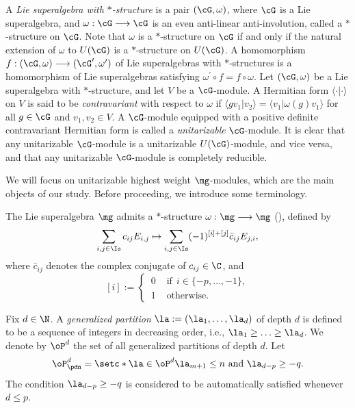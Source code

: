 \documentclass[11pt, reqno]{amsart}
\theoremstyle{definition}
\theoremstyle{remark}
\numberwithin{equation}{section}
\begin{document}
A \emph{Lie superalgebra with $*$-structure} is a pair $(\cG, \omega)$, where $\cG$ is a Lie superalgebra, and $\omega: \cG \longrightarrow \cG$ is an even anti-linear anti-involution, called a $*$-structure on $\cG$.
Note that $\omega$ is a $*$-structure on $\cG$ if and only if the natural extension of $\omega$ to $U(\cG)$ is a $*$-structure on $U(\cG)$.
A homomorphism $f: (\cG, \omega) \longrightarrow (\cG^\prime, \omega^\prime)$ of Lie superalgebras with $*$-structures is a homomorphism of Lie superalgebras satisfying $\omega^\prime \circ f = f \circ \omega$.
%
Let $(\cG, \omega)$ be a Lie superalgebra with $*$-structure, and let $V$ be a $\cG$-module. A Hermitian form $\langle\cdot|\cdot\rangle$ on $V$ is said to be \emph{contravariant} with respect to $\omega$ if
$\langle g v_1 |v_2 \rangle=\langle v_1 |\omega(g)v_1 \rangle$ for all $g \in \cG$ and $v_1, v_2 \in V$.
A $\cG$-module equipped with a positive definite contravariant Hermitian form is called a \emph{unitarizable} $\cG$-module.
It is clear that any unitarizable $\cG$-module is a unitarizable $U(\cG)$-module, and vice versa, and that any unitarizable $\cG$-module is completely reducible.

We will focus on unitarizable highest weight $\mg$-modules, which are the main objects of our study.
Before proceeding, we introduce some terminology.

The Lie superalgebra $\mg$ admits a $*$-structure $\omega: \mg \longrightarrow \mg$ (\cite[Section 3.2]{CLZ}), defined by
\begin{equation} \label{star}
 \sum_{i, j \in \Is} c_{ij} E_{i,j} \mapsto  \sum_{i, j \in \Is} (-1)^{[i]+[j]} \bar{c}_{ij} E_{j,i},
\end{equation}
where $\bar{c}_{ij}$ denotes the complex conjugate of $c_{ij} \in \C$, and
$$
[i]:=  \begin{cases}
      \, 0  & \,\,\mbox{if}  \ \  i \in \{ -p, \ldots, -1\},\\
      \, 1  & \,\, \mbox{otherwise}.
     \end{cases}
$$

Fix $d \in \N$. A \emph{generalized partition} $\la:=(\la_1,\ldots,\la_d)$ of depth $d$ is defined to be a sequence of integers in decreasing order, i.e., $\la_1 \ge \ldots \ge \la_d$.
We denote by $\oP^d$ the set of all generalized partitions of depth $d$.
Let
$$
\oP^d_\pdn=\setc*{\la \in \oP^d}{\mbox{$\la_{m+1}\le n$ and $\la_{d-p}\ge -q$}}.
$$
The condition $\la_{d-p}\ge -q$ is considered to be automatically satisfied whenever $d \le p$.
\end{document}
